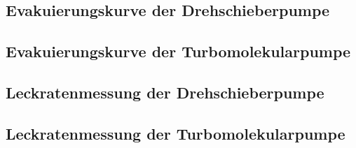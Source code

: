 \subsection{Evakuierungskurve der Drehschieberpumpe}
\label{sec:AuswEvaD}

\subsection{Evakuierungskurve der Turbomolekularpumpe}
\label{sec:AuswEvaT}

\subsection{Leckratenmessung der Drehschieberpumpe}
\label{sec:AuswLeckD}

\subsection{Leckratenmessung der Turbomolekularpumpe}
\label{sec:AuswLeckT}

